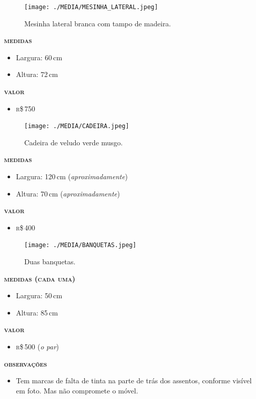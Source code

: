 \pagebreak

\begin{figure}[htpb!]
\begin{center}
\texttt{[image: ./MEDIA/MESINHA\_LATERAL.jpeg]}
\caption{Mesinha lateral branca com tampo de madeira.}
\end{center}
\end{figure}
\noindent\textsc{\textbf{medidas}}
\begin{itemize}
\item Largura: 60\,cm
\item Altura: 72\,cm
\end{itemize}
\noindent\textsc{\textbf{valor}}
\begin{itemize}
\item \textsc{r}\$\,750
\end{itemize}

\pagebreak

\begin{figure}[htpb!]
\begin{center}
\texttt{[image: ./MEDIA/CADEIRA.jpeg]}
\caption{Cadeira de veludo verde musgo.}
\end{center}
\end{figure}
\noindent\textsc{\textbf{medidas}}
\begin{itemize}
\item Largura: 120\,cm (\textit{aproximadamente})
\item Altura: 70\,cm (\textit{aproximadamente})
\end{itemize}
\noindent\textsc{\textbf{valor}}
\begin{itemize}
\item \textsc{r}\$\,400
\end{itemize}

\pagebreak

\begin{figure}[htpb!]
\texttt{[image: ./MEDIA/BANQUETAS.jpeg]}
\caption{Duas banquetas.}
\end{figure}
\noindent\textsc{\textbf{medidas (cada uma)}}
\begin{itemize}
\item Largura: 50\,cm
\item Altura: 85\,cm
\end{itemize}
\noindent\textsc{\textbf{valor}}
\begin{itemize}
\item \textsc{r}\$\,500 (\textit{o par})
\end{itemize}
\noindent\textsc{\textbf{observações}}
\begin{itemize}
\item Tem marcas de falta de tinta na parte de trás dos assentos, conforme visível em foto. Mas não compromete o móvel.
\end{itemize}

